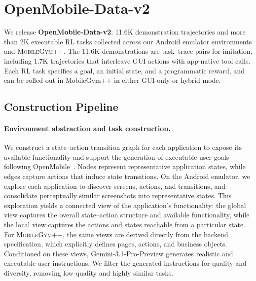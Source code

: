 
\section{OpenMobile-Data-v2}
\label{sec:data}

We release \textbf{OpenMobile-Data-v2}: 11.6K demonstration trajectories and more than 2K executable RL tasks collected across our Android emulator environments and \textsc{MobileGym++}. The 11.6K demonstrations are task--trace pairs for imitation, including 1.7K trajectories that interleave GUI actions with app-native tool calls. Each RL task specifies a goal, an initial state, and a programmatic reward, and can be rolled out in MobileGym++ in either GUI-only or hybrid mode.
\subsection{Construction Pipeline}
\label{sec:data-pipeline}
\label{sec:data-collect}

\paragraph{Environment abstraction and task construction.}
We construct a state--action transition graph for each application to expose its available functionality and support the generation of executable user goals following OpenMobile~\citep{cheng2026openmobile}. Nodes represent representative application states, while edges capture actions that induce state transitions. On the Android emulator, we explore each application to discover screens, actions, and transitions, and consolidate perceptually similar screenshots into representative states. This exploration yields a connected view of the application's functionality: the global view captures the overall state--action structure and available functionality, while the local view captures the actions and states reachable from a particular state. For \textsc{MobileGym++}, the same views are derived directly from the backend specification, which explicitly defines pages, actions, and business objects. Conditioned on these views, Gemini-3.1-Pro-Preview generates realistic and executable user instructions. We filter the generated instructions for quality and diversity, removing low-quality and highly similar tasks.

